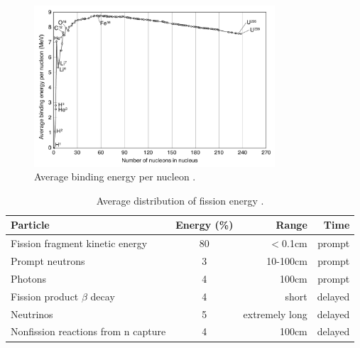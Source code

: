 \begin{figure}[h!]
  \centering
    \includegraphics[width=0.8\textwidth]{graphics/binding_energy.pdf}
     \caption{Average binding energy per nucleon \cite{wikimedia_binding}.\label{binding_e_per_nuc}}
\end{figure}

\begin{table}[h]
\centering
\caption{Average distribution of fission energy \cite{duderstadt}.\label{fission_dist}}
\begin{tabular}{| l | c | r | r |}
\hline
Particle & Energy (\%) & Range & Time \\
\hline
Fission fragment kinetic energy & 80 & $<$0.1cm & prompt \\
\hline
Prompt neutrons & 3 & 10-100cm & prompt \\
\hline
Photons & 4 & 100cm & prompt \\
\hline
Fission product $\beta$ decay & 4 & short & delayed \\
\hline
Neutrinos &  5 & extremely long & delayed \\
\hline
Nonfission reactions from n capture & 4 & 100cm & delayed \\
\hline
\end{tabular}
\end{table}

